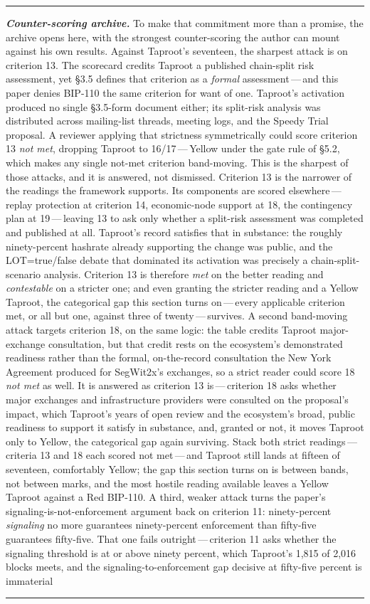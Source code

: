 \documentclass[11pt, twoside, openright]{book}
\newcommand{\sect}[1]{\S#1}
\newenvironment{detailinset}[1]{%
  \par\medskip\noindent\textcolor{gray!55}{\rule{\linewidth}{0.4pt}}\par\nobreak\vspace{2pt}%
  \footnotesize\setlength{\parindent}{0pt}\noindent\textit{\textbf{#1.}}\hspace{0.6em}\ignorespaces}{%
  \par\vspace{2pt}\noindent\textcolor{gray!55}{\rule{\linewidth}{0.4pt}}\par\normalsize\medskip}
\begin{document}
\begin{detailinset}{Counter-scoring archive}
To make that commitment more than a promise, the archive opens here, with the strongest counter-scoring the author can mount against his own results. Against Taproot's seventeen, the sharpest attack is on criterion 13. The scorecard credits Taproot a published chain-split risk assessment, yet \sect{3.5} defines that criterion as a \textit{formal} assessment\,---\,and this paper denies BIP-110 the same criterion for want of one. Taproot's activation produced no single \sect{3.5}-form document either; its split-risk analysis was distributed across mailing-list threads, meeting logs, and the Speedy Trial proposal. A reviewer applying that strictness symmetrically could score criterion 13 \textit{not met}, dropping Taproot to 16/17\,---\,Yellow under the gate rule of \sect{5.2}, which makes any single not-met criterion band-moving. This is the sharpest of those attacks, and it is answered, not dismissed. Criterion 13 is the narrower of the readings the framework supports. Its components are scored elsewhere\,---\,replay protection at criterion 14, economic-node support at 18, the contingency plan at 19\,---\,leaving 13 to ask only whether a split-risk assessment was completed and published at all. Taproot's record satisfies that in substance: the roughly ninety-percent hashrate already supporting the change was public, and the LOT=true/false debate that dominated its activation was precisely a chain-split-scenario analysis. Criterion 13 is therefore \textit{met} on the better reading and \textit{contestable} on a stricter one; and even granting the stricter reading and a Yellow Taproot, the categorical gap this section turns on\,---\,every applicable criterion met, or all but one, against three of twenty\,---\,survives. A second band-moving attack targets criterion 18, on the same logic: the table credits Taproot major-exchange consultation, but that credit rests on the ecosystem's demonstrated readiness rather than the formal, on-the-record consultation the New York Agreement produced for SegWit2x's exchanges, so a strict reader could score 18 \textit{not met} as well. It is answered as criterion 13 is\,---\,criterion 18 asks whether major exchanges and infrastructure providers were consulted on the proposal's impact, which Taproot's years of open review and the ecosystem's broad, public readiness to support it satisfy in substance, and, granted or not, it moves Taproot only to Yellow, the categorical gap again surviving. Stack both strict readings\,---\,criteria 13 and 18 each scored not met\,---\,and Taproot still lands at fifteen of seventeen, comfortably Yellow; the gap this section turns on is between bands, not between marks, and the most hostile reading available leaves a Yellow Taproot against a Red BIP-110. A third, weaker attack turns the paper's signaling-is-not-enforcement argument back on criterion 11: ninety-percent \textit{signaling} no more guarantees ninety-percent enforcement than fifty-five guarantees fifty-five. That one fails outright\,---\,criterion 11 asks whether the signaling threshold is at or above ninety percent, which Taproot's 1{,}815 of 2{,}016 blocks meets, and the signaling-to-enforcement gap decisive at fifty-five percent is immaterial 
\end{detailinset}
\end{document}
